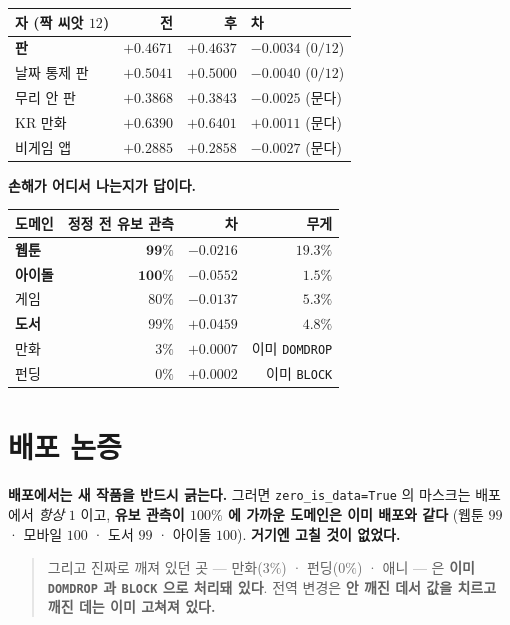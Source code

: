 \documentclass[11pt]{article}
\begin{document}
\begin{center}
\begin{tabular}{lrrl}
\hline
자 (짝 씨앗 $12$) & 전 & 후 & 차 \\
\hline
\textbf{판} & $+0.4671$ & $+0.4637$ & $\mathbf{-0.0034}$ ($0/12$) \\
날짜 통제 판 & $+0.5041$ & $+0.5000$ & $-0.0040$ ($0/12$) \\
무리 안 판 & $+0.3868$ & $+0.3843$ & $-0.0025$ (문다) \\
KR 만화 & $+0.6390$ & $+0.6401$ & $+0.0011$ (문다) \\
비게임 앱 & $+0.2885$ & $+0.2858$ & $-0.0027$ (문다) \\
\hline
\end{tabular}
\end{center}

\textbf{손해가 어디서 나는지가 답이다.}

\begin{center}
\begin{tabular}{lrrr}
\hline
도메인 & 정정 전 유보 관측 & 차 & 무게 \\
\hline
\textbf{웹툰} & $\mathbf{99\%}$ & $\mathbf{-0.0216}$ & $19.3\%$ \\
\textbf{아이돌} & $\mathbf{100\%}$ & $\mathbf{-0.0552}$ & $1.5\%$ \\
게임 & $80\%$ & $-0.0137$ & $5.3\%$ \\
\textbf{도서} & $99\%$ & $\mathbf{+0.0459}$ & $4.8\%$ \\
\hline
만화 & $3\%$ & $+0.0007$ & 이미 \texttt{DOMDROP} \\
펀딩 & $0\%$ & $+0.0002$ & 이미 \texttt{BLOCK} \\
\hline
\end{tabular}
\end{center}

\section{배포 논증}

\textbf{배포에서는 새 작품을 반드시 긁는다.} 그러면
\texttt{zero\_is\_data=True} 의 마스크는 배포에서 \emph{항상} $1$ 이고,
\textbf{유보 관측이 $100\%$ 에 가까운 도메인은 이미 배포와 같다}
(웹툰 $99$ · 모바일 $100$ · 도서 $99$ · 아이돌 $100$). \textbf{거기엔 고칠
것이 없었다.}

\begin{quote}
그리고 진짜로 깨져 있던 곳 --- 만화($3\%$) · 펀딩($0\%$) · 애니 --- 은
\textbf{이미 \texttt{DOMDROP} 과 \texttt{BLOCK} 으로 처리돼 있다}. 전역
변경은 \textbf{안 깨진 데서 값을 치르고 깨진 데는 이미 고쳐져 있다.}
\end{quote}
\end{document}
